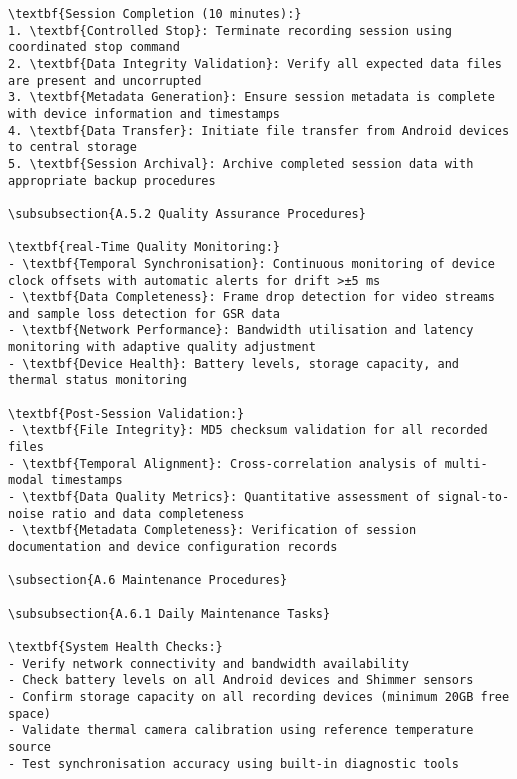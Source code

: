 \begin{verbatim}
\textbf{Session Completion (10 minutes):}
1. \textbf{Controlled Stop}: Terminate recording session using coordinated stop command
2. \textbf{Data Integrity Validation}: Verify all expected data files are present and uncorrupted
3. \textbf{Metadata Generation}: Ensure session metadata is complete with device information and timestamps
4. \textbf{Data Transfer}: Initiate file transfer from Android devices to central storage
5. \textbf{Session Archival}: Archive completed session data with appropriate backup procedures

\subsubsection{A.5.2 Quality Assurance Procedures}

\textbf{real-Time Quality Monitoring:}
- \textbf{Temporal Synchronisation}: Continuous monitoring of device clock offsets with automatic alerts for drift >±5 ms
- \textbf{Data Completeness}: Frame drop detection for video streams and sample loss detection for GSR data
- \textbf{Network Performance}: Bandwidth utilisation and latency monitoring with adaptive quality adjustment
- \textbf{Device Health}: Battery levels, storage capacity, and thermal status monitoring

\textbf{Post-Session Validation:}
- \textbf{File Integrity}: MD5 checksum validation for all recorded files
- \textbf{Temporal Alignment}: Cross-correlation analysis of multi-modal timestamps
- \textbf{Data Quality Metrics}: Quantitative assessment of signal-to-noise ratio and data completeness
- \textbf{Metadata Completeness}: Verification of session documentation and device configuration records

\subsection{A.6 Maintenance Procedures}

\subsubsection{A.6.1 Daily Maintenance Tasks}

\textbf{System Health Checks:}
- Verify network connectivity and bandwidth availability
- Check battery levels on all Android devices and Shimmer sensors
- Confirm storage capacity on all recording devices (minimum 20GB free space)
- Validate thermal camera calibration using reference temperature source
- Test synchronisation accuracy using built-in diagnostic tools


\end{verbatim}
